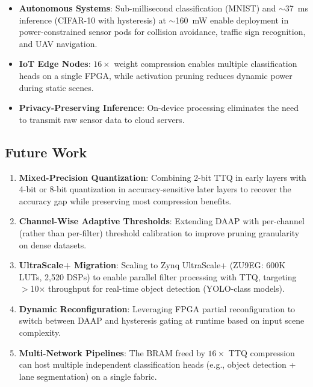 \documentclass[conference]{IEEEtran}
\begin{document}
\begin{itemize}[nosep]
    \item \textbf{Autonomous Systems}: Sub-millisecond classification (MNIST) and $\sim$37~ms inference (CIFAR-10 with hysteresis) at $\sim$160~mW enable deployment in power-constrained sensor pods for collision avoidance, traffic sign recognition, and UAV navigation.
    \item \textbf{IoT Edge Nodes}: $16\times$ weight compression enables multiple classification heads on a single FPGA, while activation pruning reduces dynamic power during static scenes.
    \item \textbf{Privacy-Preserving Inference}: On-device processing eliminates the need to transmit raw sensor data to cloud servers.
\end{itemize}

\subsection{Future Work}

\begin{enumerate}[nosep]
    \item \textbf{Mixed-Precision Quantization}: Combining 2-bit TTQ in early layers with 4-bit or 8-bit quantization in accuracy-sensitive later layers to recover the accuracy gap while preserving most compression benefits.
    \item \textbf{Channel-Wise Adaptive Thresholds}: Extending DAAP with per-channel (rather than per-filter) threshold calibration to improve pruning granularity on dense datasets.
    \item \textbf{UltraScale+ Migration}: Scaling to Zynq UltraScale+ (ZU9EG: 600K LUTs, 2,520 DSPs) to enable parallel filter processing with TTQ, targeting $>$10$\times$ throughput for real-time object detection (YOLO-class models).
    \item \textbf{Dynamic Reconfiguration}: Leveraging FPGA partial reconfiguration to switch between DAAP and hysteresis gating at runtime based on input scene complexity.
    \item \textbf{Multi-Network Pipelines}: The BRAM freed by $16\times$ TTQ compression can host multiple independent classification heads (e.g., object detection + lane segmentation) on a single fabric.
\end{enumerate}
\end{document}
